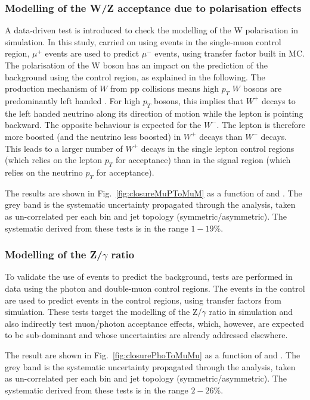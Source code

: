 \subsubsection*{Modelling of the W/Z acceptance due to polarisation effects}
\label{sec:tfSyst_Wpol}
A data-driven test is introduced to check the modelling of the W polarisation in simulation. 
In this study, carried on using events in the single-muon control region, $\mu^{+}$ events 
are used to predict $\mu^{-}$ events, using transfer factor built in MC. 
The polarisation of the W boson has an impact on the prediction 
of the \znunu background using the \mj control region, as explained in the following. 
The production mechanism of $W$ from pp
collisions means high $p_T$ $W$ bosons are predominantly left handed
\cite{WPol}.  For high $p_T$ bosons, this implies that $W^+$ decays to
the left handed neutrino along its direction of motion while the
lepton is pointing backward. The opposite behaviour is expected for
the $W^-$. The lepton is therefore more boosted (and the neutrino less
boosted) in $W^+$ decays than $W^-$ decays.  This leads to a larger
number of $W^+$ decays in the single lepton control regions (which
relies on the lepton $p_T$ for acceptance) than in the signal region
(which relies on the neutrino $p_T$ for acceptance).

The results are shown in Fig.~\ref{fig:closureMuPToMuM} as a function of \scalht and \njet. 
The grey band is the systematic uncertainty propagated through the analysis, 
taken as un-correlated per each \scalht bin and jet topology (symmetric/asymmetric). The systematic derived from these tests is
in the range $1-19\%$.

\subsubsection*{Modelling of the Z/$\gamma$ ratio}
\label{sec:tfSyst_ZGratio}
To validate the use of \gj events to predict the \znunu
background, tests are performed in data using the photon and double-muon control regions. 
The events in the \gj control are used to predict events in the \mmj control regions, 
using transfer factors from simulation. 
These tests target the modelling of the Z/$\gamma$ ratio in simulation and 
also indirectly test muon/photon acceptance effects, which, however, 
are expected to be sub-dominant and whose uncertainties are already addressed elsewhere. 

The result are shown in Fig.~\ref{fig:closurePhoToMuMu} as a function of \scalht and \njet. 
The grey band is the systematic uncertainty propagated through the analysis, 
taken as un-correlated per each \scalht bin and jet topology (symmetric/asymmetric). The systematic derived from these tests is
in the range $2-26\%$.

